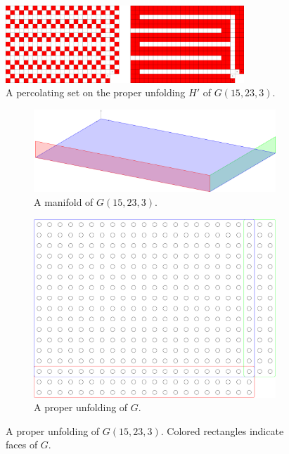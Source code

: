 \begin{figure}[]
\centering
\includegraphics[width=0.8\textwidth]{figures/7/17x25x1_unfolded.pdf}
\caption{A percolating set on the proper unfolding $H'$ of $G(15,23,3)$.}
\label{fig:17x25x1_unfolded}
\end{figure}

\begin{figure}[]
\centering
\begin{subfigure}{0.45\textwidth}
	\includegraphics[width=\textwidth]{figures/7/17x25x1_manifold_3d.pdf}
	\caption{A manifold of $G(15,23,3)$.}
	\label{}
\end{subfigure} \hfill%
\begin{subfigure}{0.45\textwidth}
	\includegraphics[width=\textwidth]{figures/7/17x25x1_manifold.pdf}
	\caption{A proper unfolding of $G$.}
	\label{}
\end{subfigure}
\caption{A proper unfolding of $G(15,23,3)$. Colored rectangles indicate faces of $G$. }
\label{fig:17x25x1_manifold}
\end{figure} 

